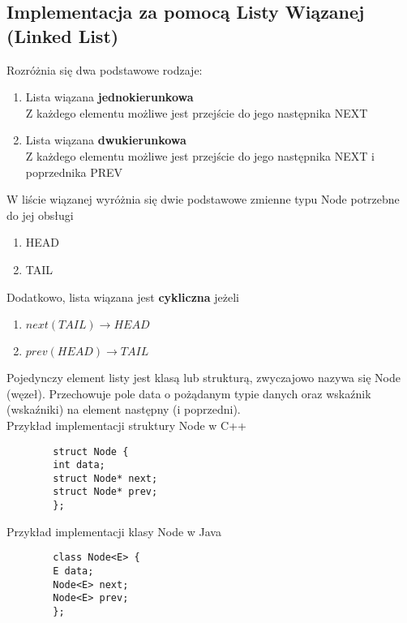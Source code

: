 \documentclass[main.tex]{subfiles}
\begin{document}
    \subsection{Implementacja za pomocą Listy Wiązanej (Linked List)}
    Rozróżnia się dwa podstawowe rodzaje:
    \begin{enumerate}
        \item Lista wiązana \textbf{jednokierunkowa} \\
        Z każdego elementu możliwe jest przejście do jego następnika NEXT
        \item Lista wiązana \textbf{dwukierunkowa} \\
        Z każdego elementu możliwe jest przejście do jego następnika NEXT i poprzednika PREV
    \end{enumerate}

    W liście wiązanej wyróżnia się dwie podstawowe zmienne typu Node potrzebne do jej obsługi

    \begin{enumerate}
        \item HEAD
        \item TAIL
    \end{enumerate}

    Dodatkowo, lista wiązana jest \textbf{cykliczna} jeżeli

    \begin{enumerate}
        \item{$next(TAIL) \rightarrow HEAD$}
        \item{$prev(HEAD) \rightarrow TAIL$}
    \end{enumerate}

    Pojedynczy element listy jest klasą lub strukturą, zwyczajowo nazywa się Node (węzeł). Przechowuje pole data o pożądanym typie danych oraz wskaźnik (wskaźniki) na element następny (i poprzedni).
    \\
    Przykład implementacji struktury Node w C++

    \begin{verbatim}
        struct Node {
        int data;
        struct Node* next;
        struct Node* prev;
        };
    \end{verbatim}
    \newpage
    Przykład implementacji klasy Node w Java

    \begin{verbatim}
        class Node<E> {
        E data;
        Node<E> next;
        Node<E> prev;
        };
    \end{verbatim}
\end{document}
